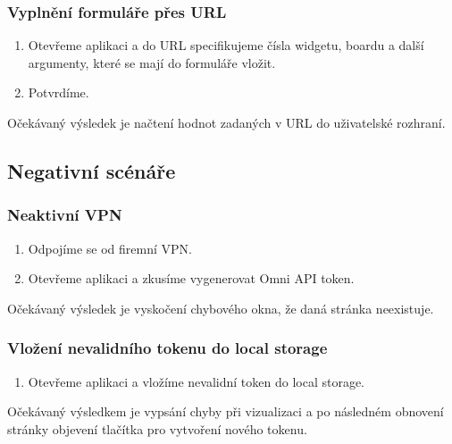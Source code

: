 \documentclass[czech, bc, kiv, he, iso690numb]{fasthesis}
\begin{document}
\subsubsection{Vyplnění formuláře přes URL}

\begin{enumerate}
	\item Otevřeme aplikaci a do URL specifikujeme čísla widgetu, boardu a další argumenty, které se mají do formuláře vložit.
	\item Potvrdíme.
\end{enumerate}
Očekávaný výsledek je načtení hodnot zadaných v URL do uživatelské rozhraní.
\subsection{Negativní scénáře}

\subsubsection{Neaktivní VPN}
\begin{enumerate}
	\item Odpojíme se od firemní VPN.
	\item Otevřeme aplikaci a zkusíme vygenerovat Omni API token.
\end{enumerate}
Očekávaný výsledek je vyskočení chybového okna, že daná stránka neexistuje.

\subsubsection{Vložení nevalidního tokenu do local storage}
\begin{enumerate}
	\item Otevřeme aplikaci a vložíme nevalidní token do local storage.
\end{enumerate}
Očekávaný výsledkem je vypsání chyby při vizualizaci a po následném obnovení stránky objevení tlačítka pro vytvoření nového tokenu.



\backmatter
\printbibliography
\listoffigures
\listoftables
\listoflistings
%
%
\setbackpageqrcode
\backpage
\end{document}
